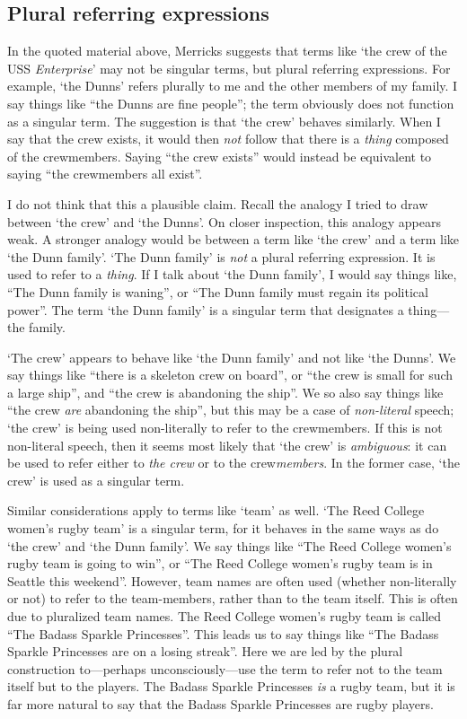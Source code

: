 \documentclass[11pt]{article}
\begin{document}
\begin{spacing}{1.25}
\subsection{Plural referring expressions}
\label{plural-ref}
In the quoted material above, Merricks suggests that terms like `the
crew of the USS {\em Enterprise}' may not be singular terms, but
plural referring expressions.  For example, `the Dunns' refers
plurally to me and the other members of my family.  I say things like
``the Dunns are fine people''; the term obviously does not function as
a singular term.  The suggestion is that `the crew' behaves similarly.
When I say that the crew exists, it would then {\em not} follow that
there is a {\em thing} composed of the crewmembers.  Saying ``the crew
exists'' would instead be equivalent to saying ``the crewmembers all
exist''.

I do not think that this a plausible claim.  Recall the analogy I
tried to draw between `the crew' and `the Dunns'.  On closer
inspection, this analogy appears weak.  A stronger analogy would be
between a term like `the crew' and a term like `the Dunn family'.
`The Dunn family' is {\em not} a plural referring expression.  It is
used to refer to a {\em thing}.  If I talk about `the Dunn family', I
would say things like, ``The Dunn family is waning'', or ``The Dunn
family must regain its political power''.  The term `the Dunn family'
is a singular term that designates a thing---the family.

`The crew' appears to behave like `the Dunn family' and not like `the
Dunns'.  We say things like ``there is a skeleton crew on board'', or
``the crew is small for such a large ship'', and ``the crew is
abandoning the ship''.  We so also say things like ``the crew {\em
  are} abandoning the ship'', but this may be a case of {\em
  non-literal} speech; `the crew' is being used non-literally to refer
to the crewmembers.  If this is not non-literal speech, then it seems
most likely that `the crew' is {\em ambiguous}: it can be used to
refer either to {\em the crew} or to the crew{\em members}.  In the
former case, `the crew' is used as a singular term.

Similar considerations apply to terms like `team' as well.  `The Reed
College women's rugby team' is a singular term, for it behaves in the
same ways as do `the crew' and `the Dunn family'.  We say things like
``The Reed College women's rugby team is going to win'', or ``The Reed
College women's rugby team is in Seattle this weekend''.  However,
team names are often used (whether non-literally or not) to refer to
the team-members, rather than to the team itself.  This is often due to
pluralized team names.  The Reed College women's rugby team is called
``The Badass Sparkle Princesses''.  This leads us to say things like
``The Badass Sparkle Princesses are on a losing streak''.  Here we are
led by the plural construction to---perhaps unconsciously---use the
term to refer not to the team itself but to the players.  The Badass
Sparkle Princesses {\em is} a rugby team, but it is far more natural
to say that the Badass Sparkle Princesses are rugby players.


\end{spacing}
\end{document}
